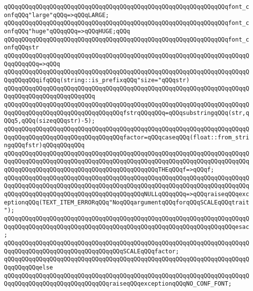 \verb|qQQqqQQqqQQqqQQqqQQqqQQqqQQqqQQqqQQqqQQqqQQqqQQqqQQqqQQqqQQqqQQqfont_confqQQq"large"qQQq=>qQQqLARGE;|\newline
\verb|qQQqqQQqqQQqqQQqqQQqqQQqqQQqqQQqqQQqqQQqqQQqqQQqqQQqqQQqqQQqqQQqfont_confqQQq"huge"qQQqqQQq=>qQQqHUGE;qQQq|\newline
\newline
\verb|qQQqqQQqqQQqqQQqqQQqqQQqqQQqqQQqqQQqqQQqqQQqqQQqqQQqqQQqqQQqqQQqfont_confqQQqstr|\newline
\verb|qQQqqQQqqQQqqQQqqQQqqQQqqQQqqQQqqQQqqQQqqQQqqQQqqQQqqQQqqQQqqQQqqQQqqQQqqQQqqQQq=>qQQq|\newline
\verb|qQQqqQQqqQQqqQQqqQQqqQQqqQQqqQQqqQQqqQQqqQQqqQQqqQQqqQQqqQQqqQQqqQQqqQQqqQQqqQQqifqQQq(string::is_prefixqQQq"size="qQQqstr)|\newline
\verb|qQQqqQQqqQQqqQQqqQQqqQQqqQQqqQQqqQQqqQQqqQQqqQQqqQQqqQQqqQQqqQQqqQQqqQQqqQQqqQQqqQQqqQQqqQQqqQQq|\newline
\verb|qQQqqQQqqQQqqQQqqQQqqQQqqQQqqQQqqQQqqQQqqQQqqQQqqQQqqQQqqQQqqQQqqQQqqQQqqQQqqQQqqQQqqQQqqQQqqQQqqQQqqQQqfstrqQQqqQQq=qQQqsubstringqQQq(str,qQQq5,qQQq(sizeqQQqstr)-5);|\newline
\newline
\verb|qQQqqQQqqQQqqQQqqQQqqQQqqQQqqQQqqQQqqQQqqQQqqQQqqQQqqQQqqQQqqQQqqQQqqQQqqQQqqQQqqQQqqQQqqQQqqQQqqQQqqQQqfactor=qQQqcaseqQQq(float::from_stringqQQqfstr)qQQqqQQqqQQq|\newline
\verb|qQQqqQQqqQQqqQQqqQQqqQQqqQQqqQQqqQQqqQQqqQQqqQQqqQQqqQQqqQQqqQQqqQQqqQQqqQQqqQQqqQQqqQQqqQQqqQQqqQQqqQQqqQQqqQQqqQQqqQQqqQQqqQQqqQQqqQQqqQQqqQQqqQQqqQQqqQQqqQQqqQQqqQQqqQQqqQQqqQQqqQQqTHEqQQqf=>qQQqf;|\newline
\verb|qQQqqQQqqQQqqQQqqQQqqQQqqQQqqQQqqQQqqQQqqQQqqQQqqQQqqQQqqQQqqQQqqQQqqQQqqQQqqQQqqQQqqQQqqQQqqQQqqQQqqQQqqQQqqQQqqQQqqQQqqQQqqQQqqQQqqQQqqQQqqQQqqQQqqQQqqQQqqQQqqQQqqQQqqQQqqQQqqQQqNULLqQQqqQQq=>qQQqraiseqQQqexceptionqQQq(TEXT_ITEM_ERRORqQQq"NoqQQqargumentqQQqforqQQqSCALEqQQqtrait");|\newline
\verb|qQQqqQQqqQQqqQQqqQQqqQQqqQQqqQQqqQQqqQQqqQQqqQQqqQQqqQQqqQQqqQQqqQQqqQQqqQQqqQQqqQQqqQQqqQQqqQQqqQQqqQQqqQQqqQQqqQQqqQQqqQQqqQQqqQQqqQQqesac;|\newline
\verb|qQQqqQQqqQQqqQQqqQQqqQQqqQQqqQQqqQQqqQQqqQQqqQQqqQQqqQQqqQQqqQQqqQQqqQQqqQQqqQQqqQQqqQQqqQQqqQQqqQQqqQQqSCALEqQQqfactor;|\newline
\verb|qQQqqQQqqQQqqQQqqQQqqQQqqQQqqQQqqQQqqQQqqQQqqQQqqQQqqQQqqQQqqQQqqQQqqQQqqQQqqQQqelse|\newline
\verb|qQQqqQQqqQQqqQQqqQQqqQQqqQQqqQQqqQQqqQQqqQQqqQQqqQQqqQQqqQQqqQQqqQQqqQQqqQQqqQQqqQQqqQQqqQQqqQQqqQQqraiseqQQqexceptionqQQqNO_CONF_FONT;|\newline
